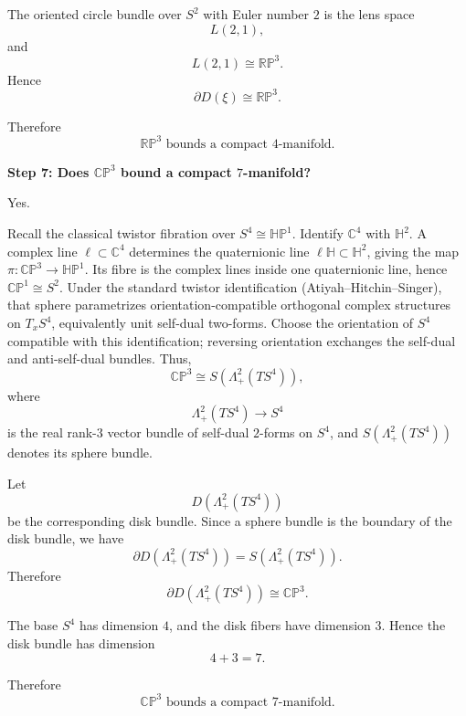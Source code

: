 \begin{solution}
The oriented circle bundle over \(S^2\) with Euler number \(2\) is the lens space
\[
L(2,1),
\]
and
\[
L(2,1)\cong \mathbb{RP}^3.
\]
Hence
\[
\partial D(\xi)\cong \mathbb{RP}^3.
\]

Therefore
\[
\boxed{
	\mathbb{RP}^3
	\text{ bounds a compact }4\text{-manifold.}
}
\]


\medskip
\noindent\textbf{Step 7: Does \(\mathbb{CP}^3\) bound a compact \(7\)-manifold?}\par
\smallskip


Yes.

Recall the classical twistor fibration over \(S^4\cong\mathbb{HP}^1\). Identify \(\mathbb C^4\) with \(\mathbb H^2\). A complex line \(\ell\subset\mathbb C^4\) determines the quaternionic line \(\ell\mathbb H\subset\mathbb H^2\), giving the map \(\pi:\mathbb{CP}^3\to\mathbb{HP}^1\). Its fibre is the complex lines inside one quaternionic line, hence \(\mathbb{CP}^1\cong S^2\). Under the standard twistor identification (Atiyah--Hitchin--Singer), that sphere parametrizes orientation-compatible orthogonal complex structures on \(T_xS^4\), equivalently unit self-dual two-forms. Choose the orientation of \(S^4\) compatible with this identification; reversing orientation exchanges the self-dual and anti-self-dual bundles. Thus,
\[
\mathbb{CP}^3
\cong
S(\Lambda^2_+(TS^4)),
\]
where
\[
\Lambda^2_+(TS^4)\to S^4
\]
is the real rank-\(3\) vector bundle of self-dual \(2\)-forms on \(S^4\), and
\(S(\Lambda^2_+(TS^4))\) denotes its sphere bundle.

Let
\[
D(\Lambda^2_+(TS^4))
\]
be the corresponding disk bundle. Since a sphere bundle is the boundary of the
disk bundle, we have
\[
\partial D(\Lambda^2_+(TS^4))
=
S(\Lambda^2_+(TS^4)).
\]
Therefore
\[
\partial D(\Lambda^2_+(TS^4))
\cong
\mathbb{CP}^3.
\]

The base \(S^4\) has dimension \(4\), and the disk fibers have dimension \(3\).
Hence the disk bundle has dimension
\[
4+3=7.
\]

Therefore
\[
\boxed{
	\mathbb{CP}^3
	\text{ bounds a compact }7\text{-manifold.}
}
\]
\end{solution}

